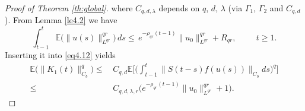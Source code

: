 \documentclass[10pt]{article}
\numberwithin{figure}{section}
\numberwithin{equation}{section}
\newcommand{\0}{{\theta}}
\def\E{\mathbb{E}}
\def\Hs{\hspace{1cm}}\def\hs{\hspace{0.5cm}}
\begin{document}
\begin{proof}[Proof of Theorem \ref{th:global}]
where $C_{q,d,\lambda}$ depends on $q$, $d$, $\lambda$ (via $\Gamma_1$, $\Gamma_2$ and $C_{q,d}$).
From Lemma \ref{le4.2} we have 
$$
\int_{t-1}^t \mathbb{E}\big(\| u(s) \|_{L^{qr}}^{qr} \big)\, ds
\le \,e^{-\rho_{qr}(t-1)} \| u_0 \|_{L^{qr}}^{qr} + R_{qr}, \Hs t \ge 1.
$$
Inserting it into \eqref{eq4.12} yields 
\begin{equation}\label{eq3.18}
\begin{split}
\mathbb{E}\big(\| K_1(t)\|_{C_b}^q\big)\le&\,C_{q,d}\E\Big[\Big(\int_{t-1}^t \|S(t-s)f(u(s))\|_{C_b}ds\Big)^q\Big]\\
\le&\, C_{q,d,\lambda, r} \big(e^{-\rho_{qr}(t-1)}\| u_0 \|_{L^{qr}}^{qr} + 1 \big).
\end{split}
\end{equation}



\end{proof}
\end{document}
